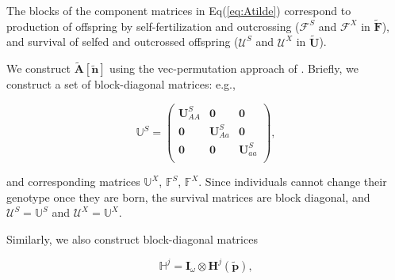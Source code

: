 \documentclass[11pt]{article}
\def\mbf#1{\mathbf{#1}}
\def\mbb#1{\mathbb{#1}}
\def\mcal#1{\mathcal{#1}}
\begin{document}
\noindent The blocks of the component matrices in Eq(\ref{eq:Atilde}) correspond to production of offspring by self-fertilization and outcrossing ($\mcal{F}^S$ and $\mcal{F}^X$ in $\tilde{\mbf{F}}$), and survival of selfed and outcrossed offspring ($\mcal{U}^S$ and $\mcal{U}^X$ in $\tilde{\mbf{U}}$). 

We construct $\tilde{\mbf{A}}[\tilde{\mbf{n}}]$ using the vec-permutation approach of \citet{CaswellEtAl2018}. Briefly, we construct a set of block-diagonal matrices: e.g.,
\begin{linenomath*}
\begin{equation} \label{eq:US}
	\mbb{U}^S = 
		\left(
			\begin{array}{ccc}
				\mbf{U}^{S}_{AA} & \mbf{0} & \mbf{0} \\
				\mbf{0} & \mbf{U}^{S}_{Aa} & \mbf{0} \\
				\mbf{0} & \mbf{0} & \mbf{U}^{S}_{aa} \\
			\end{array} \right),
\end{equation}
\end{linenomath*}

\noindent and corresponding matrices $\mbb{U}^X$, $\mbb{F}^S$, $\mbb{F}^X$. Since individuals cannot change their genotype once they are born, the survival matrices are block diagonal, and $\mcal{U}^S = \mbb{U}^S$ and $\mcal{U}^X = \mbb{U}^X$. 

Similarly, we also construct block-diagonal matrices
\begin{linenomath*}
\begin{equation}
	\mbb{H}^j = \mbf{I}_{\omega} \otimes \mbf{H}^j(\tilde{\mbf{p}}),
\end{equation}
\end{linenomath*}
\end{document}
